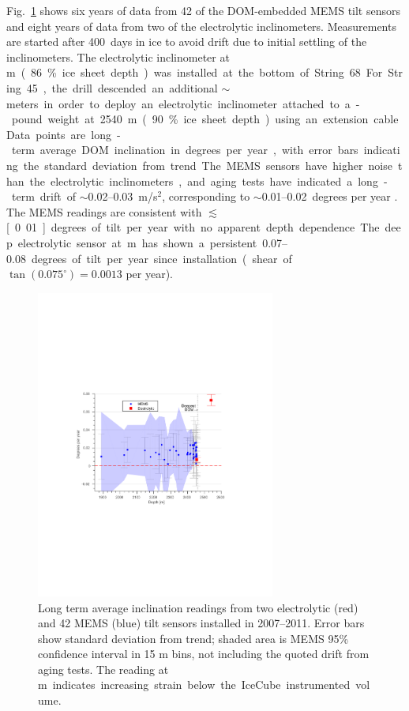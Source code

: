 Fig.~\ref{fig:tilt} shows
six years of data from 42 of the DOM-embedded MEMS tilt sensors and
eight years of data from two of the electrolytic
inclinometers. Measurements are started after 400~days in ice to avoid 
drift due to initial settling of the inclinometers. The electrolytic
inclinometer at \unit[2455]m (86\% ice sheet depth) was 
installed at the bottom of String 68.  For String 45, the drill
descended an additional $\sim$\unit[100]meters in order to deploy an
electrolytic inclinometer attached to a \unit[100]-pound weight at 2540 m
(90\% ice sheet depth) using an extension cable. Data
points are long-term average DOM inclination in degrees per year, with error
bars indicating the standard deviation from trend.  The MEMS sensors have
higher noise than the electrolytic inclinometers, and aging tests have indicated a long-term
drift of $\sim$\numrange[range-phrase = --]{0.02}{0.03}~m/s$^2$, corresponding to
$\sim$\numrange[range-phrase = --]{0.01}{0.02}~degrees per year
\cite{inclinometer_comm}. The MEMS readings are consistent with
$\lesssim$\unit[0.01]degrees of tilt per year with no apparent depth
dependence.  The deep electrolytic sensor 
at \unit[2540]m has shown a persistent \numrange[range-phrase =
  --]{0.07}{0.08} degrees of tilt per year since installation (shear
  of $\tan(0.075^\circ) = 0.0013$
per year).

\begin{figure}[!ht]
	\centering
    \includegraphics[width=0.7\textwidth]{graphics/geometry/tilt5.pdf}
	\caption{Long term average inclination readings from two electrolytic
      (red) and 42 MEMS (blue) tilt sensors installed in 2007--2011.  Error
      bars show standard deviation from trend; shaded area is MEMS 95\%
      confidence interval in 15 m bins, not including the quoted drift
      from aging tests.  The reading at \unit[2540]m
      indicates increasing strain below the IceCube instrumented volume.}
	\label{fig:tilt}
\end{figure}

